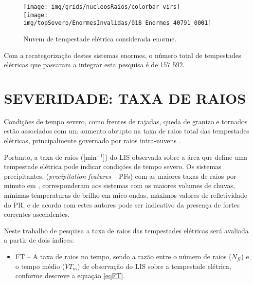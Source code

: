 \begin{figure}[hb]
\centering
\texttt{[image: img/grids/nucleosRaios/colorbar\_virs]}\\
\texttt{[image: img/topSevero/EnormesInvalidas/018\_Enormes\_40791\_0001]}
\caption{Nuvem de tempestade elétrica considerada enorme.}  
\label{nuvem221}
\end{figure}

Com a recategorização destes sistemas enormes, o número total de tempestades elétricas que passaram a integrar esta pesquisa é de {157 592}.




\section{SEVERIDADE: TAXA DE RAIOS}
\label{metodoFtaFt}

Condições de tempo severo, como frentes de rajadas, queda de granizo e tornados estão associados com um aumento abrupto na taxa de raios total das tempestades elétricas, principalmente governado por raios intra-nuvens \cite{macgorman1989,carey1998,williams1999}.   

Portanto, a taxa de raios ([min$^{-1}$]) do LIS observada sobre a área que define uma tempestade elétrica pode indicar condições de tempo severo. Os sistemas precipitantes, (\textit{precipitation features} -- PFs) com as maiores 
taxas de raios por minuto em , corresponderam aos sistemas com os maiores volumes de chuvas, mínimas temperaturas de brilho em mico-ondas, máximos valores de refletividade do PR, e de acordo com estes autores pode ser indicativo da presença de fortes correntes ascendentes. 

Neste trabalho de pesquisa a taxa de raios das tempestades elétricas será avaliada a partir de dois índices:

\begin{itemize}
\item FT -- A taxa de raios no tempo, sendo a razão entre o número de raios ($N_{fl}$) e o tempo médio ($VT_m$) de observação do LIS sobre a tempestade elétrica, conforme descreve a equação \ref{eqFT}.
\end{itemize}

